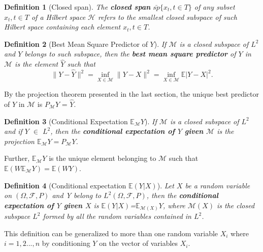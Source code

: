 \documentclass{article}
\newtheorem{defn}{Definition}
\begin{document}
\begin{defn}[Closed span]
The \textbf{closed span} $\bar{sp}\{x_t, t \in T\}$ of any subset ${x_t, t \in T}$ of a Hilbert space $\mathscr{H}$ refers to the smallest closed subspace of such Hilbert space containing each element $x_t, t \in T$. \newline
\end{defn}

\begin{defn}[Best Mean Square Predictor of $Y$]
If $\mathscr{M}$ is a closed subspace of $L^2$ and $Y$ belongs to such subspace, then the \textbf{best mean square predictor} of $Y$ in $\mathscr{M}$ is the element $\hat{Y}$ such that 
\[
\lVert Y - \hat{Y}\rVert^2 = \inf_{X \in \mathscr{M}} \lVert Y - X\rVert^2 = \inf_{X \in \mathscr{M}} \mathbb E| Y - X |^2.
\] 
\end{defn}
By the projection theorem presented in the last section, the unique best predictor of $Y$ in $\mathscr{M}$ is $P_\mathscr{M}$$Y$ = $\hat{Y}$. \newline

\begin{defn}[Conditional Expectation $\mathbb E_{\mathscr{M}}Y$]
If $\mathscr{M}$ is a closed subspace of $L^2$ and if $Y$ $\in$ $L^2$, then the \textbf{conditional expectation of $Y$ given $\mathscr{M}$} is the projection $\mathbb E_{\mathscr{M}}Y=P_\mathscr{M}Y$.
\end{defn}
Further, $\mathbb E_{\mathscr{M}}Y$ is the unique element belonging to $\mathscr{M}$ such that $\mathbb E(W\mathbb E_{\mathscr{M}}Y)=\mathbb E(WY)$. \newline

\begin{defn}[Conditional expectation $\mathbb E(Y|X)$]
Let $X$ be a random variable on $(\Omega, \mathscr{F}, P)$ and Y belong to $L^2(\Omega, \mathscr{F}, P)$, then the \textbf{conditional expectation of $Y$ given $X$} is $\mathbb E(Y|X)$=$\mathbb E_{\mathscr{M}(X)}Y$, where $\mathscr{M}(X)$ is the closed subspace $L^2$ formed by all the random variables contained in $L^2$.
\end{defn}
This definition can be generalized to more than one random variable $X_i$ where $i=1,2...,n$ by conditioning $Y$ on the vector of variables $X_i$. \newline
\end{document}
